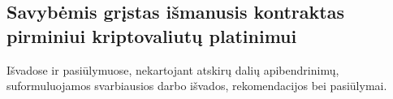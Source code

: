 \documentclass{VUMIFInfKursinis}
\begin{document}
\subsection{Savybėmis grįstas išmanusis kontraktas pirminiui kriptovaliutų platinimui}






Išvadose ir pasiūlymuose, nekartojant atskirų dalių apibendrinimų,
suformuluojamos svarbiausios darbo išvados, rekomendacijos bei pasiūlymai.



\printbibliography[heading=bibintoc] %

\appendix  %
%
\end{document}
